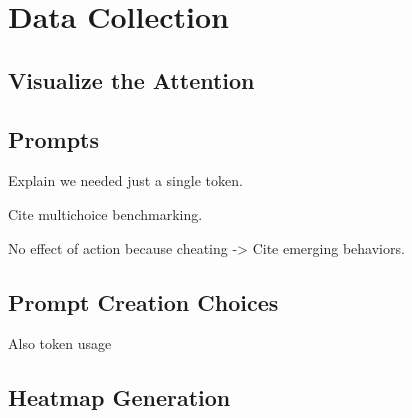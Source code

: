 \chapter{Data Collection}
\label{cha:data_collection}

\section{Visualize the Attention}
\label{sec:visualize_the_attention}

\section{Prompts}
\label{sec:prompts}

Explain we needed just a single token.

Cite multichoice benchmarking.

No effect of action because cheating -> Cite emerging behaviors.
\section{Prompt Creation Choices}
\label{sec:prompt_creation_choices}

Also token usage

\section{Heatmap Generation}
\label{sec:heatmap_generation}
